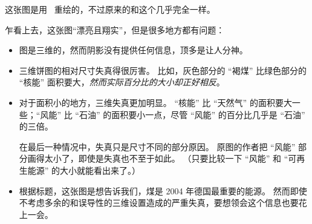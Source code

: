 \bohs

这张图是用 \tikzname\ 重绘的，不过原来的和这个几乎完全一样。

乍看上去，这张图“漂亮且翔实”，但是很多地方都有问题：

\eohs

\begin{itemize}
\item
  图是三维的，然而阴影没有提供任何信息，顶多是让人分神。
\item
  三维饼图的相对尺寸失真得很厉害。
  比如，灰色部分的 “褐煤” 比绿色部分的 “核能” 面积要大，\emph{然而实际百分比的大小却正好相反}。
\item
  对于面积小的地方，三维失真更加明显。
  “核能” 比 “天然气” 的面积要大一些；“风能” 比 “石油” 的面积要小一点，尽管 “风能” 的百分比几乎是 “石油” 的三倍。

  在最后一种情况中，失真只是尺寸不同的部分原因。
  原图的作者把 “风能” 部分画得太小了，即使是失真也不至于如此。
  （只要比较一下 “风能” 和 “可再生能源” 的大小就能看出来了。）
\item
  根据标题，这张图是想告诉我们，煤是 2004 年德国最重要的能源。
  然而即使不考虑多余的和误导性的三维设置造成的严重失真，要想领会这个信息也要花上一会。


\end{itemize}

